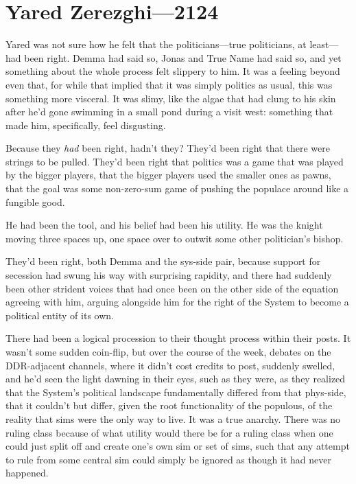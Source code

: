 \hypertarget{yared-zerezghi-2124}{%
\chapter{Yared Zerezghi—2124}\label{yared-zerezghi-2124}}

Yared was not sure how he felt that the politicians---true politicians, at least---had been right. Demma had said so, Jonas and True Name had said so, and yet something about the whole process felt slippery to him. It was a feeling beyond even that, for while that implied that it was simply politics as usual, this was something more visceral. It was slimy, like the algae that had clung to his skin after he'd gone swimming in a small pond during a visit west: something that made him, specifically, feel disgusting.

Because they \emph{had} been right, hadn't they? They'd been right that there were strings to be pulled. They'd been right that politics was a game that was played by the bigger players, that the bigger players used the smaller ones as pawns, that the goal was some non-zero-sum game of pushing the populace around like a fungible good.

He had been the tool, and his belief had been his utility. He was the knight moving three spaces up, one space over to outwit some other politician's bishop.

They'd been right, both Demma and the sys-side pair, because support for secession had swung his way with surprising rapidity, and there had suddenly been other strident voices that had once been on the other side of the equation agreeing with him, arguing alongside him for the right of the System to become a political entity of its own.

There had been a logical procession to their thought process within their posts. It wasn't some sudden coin-flip, but over the course of the week, debates on the DDR-adjacent channels, where it didn't cost credits to post, suddenly swelled, and he'd seen the light dawning in their eyes, such as they were, as they realized that the System's political landscape fundamentally differed from that phys-side, that it couldn't but differ, given the root functionality of the populous, of the reality that sims were the only way to live. It was a true anarchy. There was no ruling class because of what utility would there be for a ruling class when one could just split off and create one's own sim or set of sims, such that any attempt to rule from some central sim could simply be ignored as though it had never happened.


